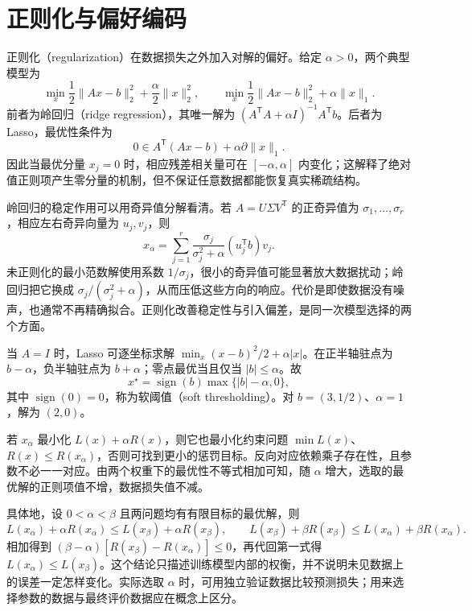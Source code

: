 \documentclass[UTF8,12pt,a4paper,fontset=fandol]{ctexbook}
\begin{document}
\section{正则化与偏好编码}

正则化（regularization）在数据损失之外加入对解的偏好。给定 $\alpha>0$，两个典型模型为
\begin{equation}
 \min_x\frac12\|Ax-b\|_2^2+\frac\alpha2\|x\|_2^2,
 \qquad
 \min_x\frac12\|Ax-b\|_2^2+\alpha\|x\|_1.
 \label{eq:co-regularized-fitting}
\end{equation}
前者为岭回归（ridge regression），其唯一解为 $(A^{\mathsf T}A+\alpha I)^{-1}A^{\mathsf T}b$。后者为 Lasso，最优性条件为
\[
 0\in A^{\mathsf T}(Ax-b)+\alpha\partial\|x\|_1.
\]
因此当最优分量 $x_j=0$ 时，相应残差相关量可在 $[-\alpha,\alpha]$ 内变化；这解释了绝对值正则项产生零分量的机制，但不保证任意数据都能恢复真实稀疏结构。

岭回归的稳定作用可以用奇异值分解看清。若 $A=U\Sigma V^{\mathsf T}$ 的正奇异值为 $\sigma_1,\ldots,\sigma_r$，相应左右奇异向量为 $u_j,v_j$，则
\[
 x_\alpha=\sum_{j=1}^r
 \frac{\sigma_j}{\sigma_j^2+\alpha}(u_j^{\mathsf T}b)v_j.
\]
未正则化的最小范数解使用系数 $1/\sigma_j$，很小的奇异值可能显著放大数据扰动；岭回归把它换成 $\sigma_j/(\sigma_j^2+\alpha)$，从而压低这些方向的响应。代价是即使数据没有噪声，也通常不再精确拟合。正则化改善稳定性与引入偏差，是同一次模型选择的两个方面。

\begin{example}[软阈值]
当 $A=I$ 时，Lasso 可逐坐标求解 $\min_x(x-b)^2/2+\alpha|x|$。在正半轴驻点为 $b-\alpha$，负半轴驻点为 $b+\alpha$；零点最优当且仅当 $|b|\leq\alpha$。故
\[
 x^\star=\operatorname{sign}(b)\max\{|b|-\alpha,0\},
\]
其中 $\operatorname{sign}(0)=0$，称为软阈值（soft thresholding）。对 $b=(3,1/2)$、$\alpha=1$，解为 $(2,0)$。
\end{example}

若 $x_\alpha$ 最小化 $L(x)+\alpha R(x)$，则它也最小化约束问题 $\min L(x)$、$R(x)\leq R(x_\alpha)$，否则可找到更小的惩罚目标。反向对应依赖乘子存在性，且参数不必一一对应。由两个权重下的最优性不等式相加可知，随 $\alpha$ 增大，选取的最优解的正则项值不增，数据损失值不减。

具体地，设 $0<\alpha<\beta$ 且两问题均有有限目标的最优解，则
\[
 L(x_\alpha)+\alpha R(x_\alpha)\leq L(x_\beta)+\alpha R(x_\beta),
 \qquad
 L(x_\beta)+\beta R(x_\beta)\leq L(x_\alpha)+\beta R(x_\alpha).
\]
相加得到 $(\beta-\alpha)[R(x_\beta)-R(x_\alpha)]\leq0$，再代回第一式得 $L(x_\alpha)\leq L(x_\beta)$。这个结论只描述训练模型内部的权衡，并不说明未见数据上的误差一定怎样变化。实际选取 $\alpha$ 时，可用独立验证数据比较预测损失；用来选择参数的数据与最终评价数据应在概念上区分。
\end{document}
